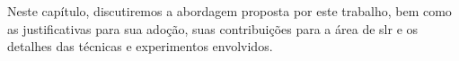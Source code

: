 Neste capítulo, discutiremos a abordagem proposta por este trabalho, bem como as justificativas para sua adoção, suas contribuições para a área de \acrshort{slr} e os detalhes das técnicas e experimentos envolvidos.


















